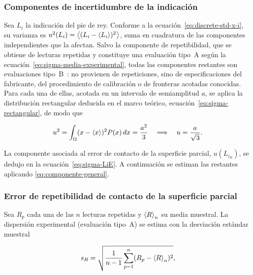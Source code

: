 
\subsubsection{Componentes de incertidumbre de la indicación}

Sea $L_i$ la indicación del pie de rey. Conforme a la
ecuación~\eqref{eq:discrete-std-x-i}, su varianza es
$u^2(L_i) = \left\langle (L_i - \left\langle L_i \right\rangle)^2 \right\rangle$, suma en cuadratura de las componentes
independientes que la afectan. Salvo la componente de repetibilidad, que se obtiene
de lecturas repetidas y constituye una evaluación tipo~A según la
ecuación~\eqref{eq:sigma-media-experimental}, todas las componentes restantes son
evaluaciones tipo~B~\parencite{jcgm2008gum}: no provienen de repeticiones, sino de
especificaciones del fabricante, del procedimiento de calibración o de fronteras
acotadas conocidas. Para cada una de ellas, acotada en un intervalo de semiamplitud
$a$, se aplica la distribución rectangular deducida en el marco teórico,
ecuación~\eqref{eq:sigma-rectangular}, de modo que

\begin{equation}
    u^2 = \int_\Omega (x - \left\langle x \right\rangle)^2 P(x)\,dx = \frac{a^2}{3}
    \quad\Longrightarrow\quad
    u = \frac{a}{\sqrt{3}} .
    \label{eq:componente-general}
\end{equation}

La componente asociada al error de contacto de la superficie parcial,
$u(L_{i_E})$, se dedujo en la ecuación~\eqref{eq:sigma-LiE}. A continuación se
estiman las restantes aplicando \eqref{eq:componente-general}.

\subsubsection*{Error de repetibilidad de contacto de la superficie parcial}

Sea $R_p$ cada una de las $n$ lecturas repetidas y $\left\langle R \right\rangle_n$ su media muestral. La
dispersión experimental (evaluación tipo~A) se estima con la desviación estándar
muestral

\begin{equation}
    s_R = \sqrt{\frac{1}{n-1} \sum_{p=1}^n (R_p - \left\langle R \right\rangle_n)^2},
    \label{eq:desv-estandar-muestral}
\end{equation}

